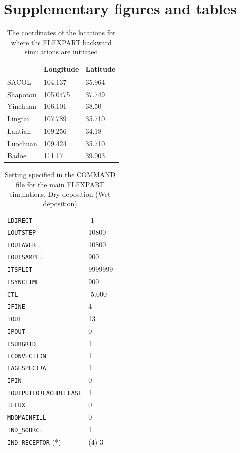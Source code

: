
\chapter{Supplementary figures and tables}

\begin{table}[htpb]
\caption{The coordinates of the locations for where the FLEXPART backward simulations are initiated}
\centering
\label{tab:coordinates_clp}
\begin{tabular}{@{}lll@{}}
\toprule
 & Longitude & Latitude \\ \midrule
SACOL & 104.137 & 35.964 \\
Shapotou  & 105.0475 & 37.749  \\
Yinchuan & 106.101 & 38.50 \\
Lingtai & 107.789 &  35.710\\
Lantian & 109.256 & 34.18 \\
Luochuan & 109.424 &  35.710\\
Badoe & 111.17  &  39.003  \\ \bottomrule
\end{tabular}
\end{table}



\begin{table}[htpb]
    \centering
    \label{tab:command_file}
    \caption{Setting specified in the COMMAND file for the main FLEXPART simulations. Dry deposition (Wet deposition) }
    \begin{tabular}{@{}ll@{}}
        \toprule
        \verb|LDIRECT| & -1 \\ 
        \verb|LOUTSTEP| & 10800 \\
        \verb|LOUTAVER| & 10800 \\
        \verb|LOUTSAMPLE| & 900 \\
        \verb|ITSPLIT| & 9999999 \\
        \verb|LSYNCTIME| & 900 \\
        \verb|CTL| & -5.000 \\
        \verb|IFINE| & 4 \\
        \verb|IOUT| & 13 \\
        \verb|IPOUT| & 0 \\
        \verb|LSUBGRID| & 1 \\
        \verb|LCONVECTION| & 1 \\
        \verb|LAGESPECTRA| & 1 \\
        \verb|IPIN| & 0 \\
        \verb|IOUTPUTFOREACHRELEASE| & 1 \\
        \verb|IFLUX| & 0 \\
        \verb|MDOMAINFILL| & 0 \\
        \verb|IND_SOURCE| & 1 \\
        \verb|IND_RECEPTOR| (*) & (4) 3 \\ \bottomrule
        
    \end{tabular}


\end{table}



